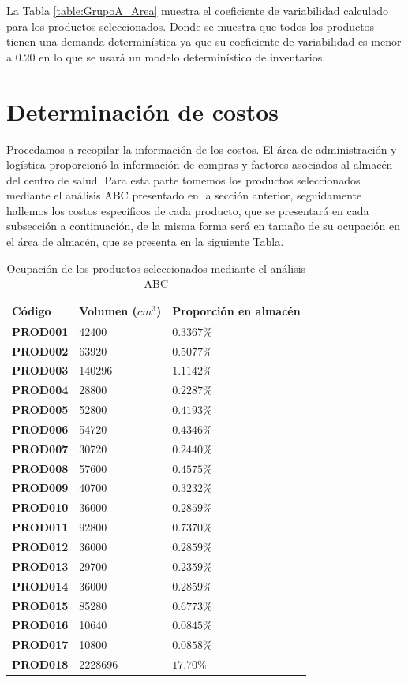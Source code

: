 La Tabla \ref{table:GrupoA_Area} muestra el coeficiente de variabilidad calculado para los productos seleccionados. Donde se muestra que todos los productos tienen una demanda determinística ya que su coeficiente de variabilidad es menor a 0.20 en lo que se usará un modelo determinístico de inventarios.

\section{Determinación de costos}

Procedamos a recopilar la información de los costos. El área de administración y logística proporcionó la información de compras y factores asociados al almacén del centro de salud. Para esta parte tomemos los productos seleccionados mediante el análisis ABC presentado en la sección anterior, seguidamente hallemos los costos específicos de cada producto, que se presentará en cada subsección a continuación, de la misma forma será en tamaño de su ocupación en el área de almacén, que se presenta en la siguiente Tabla.

\begin{table}[H]
    \caption{Ocupación de los productos seleccionados mediante el análisis ABC}
    \begin{tabular}{p{2cm} p{3cm} p{5cm}} %
        \hline
        \textbf{Código} & \textbf{Volumen ($cm^3$)} & \textbf{Proporción en almacén} \\
        \hline
        \textbf{PROD001} & 42400 & $0.3367\%$ \\
        \textbf{PROD002} & 63920 & $0.5077\%$ \\
        \textbf{PROD003} & 140296 & $1.1142\%$ \\
        \textbf{PROD004} & 28800 & $0.2287\%$ \\
        \textbf{PROD005} & 52800 & $0.4193\%$ \\
        \textbf{PROD006} & 54720 & $0.4346\%$ \\
        \textbf{PROD007} & 30720 & $0.2440\%$ \\
        \textbf{PROD008} & 57600 & $0.4575\%$ \\
        \textbf{PROD009} & 40700 & $0.3232\%$ \\
        \textbf{PROD010} & 36000 & $0.2859\%$ \\
        \textbf{PROD011} & 92800 & $0.7370\%$ \\
        \textbf{PROD012} & 36000 & $0.2859\%$ \\
        \textbf{PROD013} & 29700 & $0.2359\%$ \\
        \textbf{PROD014} & 36000 & $0.2859\%$ \\
        \textbf{PROD015} & 85280 & $0.6773\%$ \\
        \textbf{PROD016} & 10640 & $0.0845\%$ \\
        \textbf{PROD017} & 10800 & $0.0858\%$ \\
        \textbf{PROD018} & 2228696 & $17.70\%$ \\
        \hline
    \end{tabular}
    \label{table:GrupoA_Ocupacion}
\end{table}

